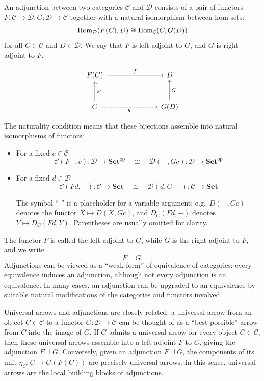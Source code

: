 \begin{definition}
An adjunction between two categories $\mathcal{C}$ and $\mathcal{D}$ consists of a pair of functors
\(
F : \mathcal{C} \to \mathcal{D}, G : \mathcal{D} \to \mathcal{C}
\)
together with a natural isomorphism between hom-sets:
\[
\mathrm{Hom}_{\mathcal{D}}(F(C), D) \cong \mathrm{Hom}_{\mathcal{C}}(C, G(D))
\]
for all $C \in \mathcal{C}$ and $D \in \mathcal{D}$.
We say that $F$ is left adjoint to $G$, and $G$ is right adjoint to $F$.

\[
\begin{tikzcd}[row sep=large, column sep=large]
F(C) \arrow[rr, "f"] & & D \\
C \arrow[u, "F"'] \arrow[rr, dashed, "g"'] & & G(D) \arrow[u, "G"']
\end{tikzcd}
\]


The naturality condition means that these bijections assemble into natural isomorphisms of functors:
\begin{itemize}
  \item For a fixed $c \in \mathcal{C}$
  \[
  \mathcal{C}(F-,c) : \mathcal{D} \to \mathbf{Set}^{\mathrm{op}}
  \quad \cong \quad
  \mathcal{D}(-,Gc) : \mathcal{D} \to \mathbf{Set}^{\mathrm{op}}
  \]
  \item For a fixed $d \in \mathcal{D}$
  \[
  \mathcal{C}(Fd,-) : \mathcal{C} \to \mathbf{Set}
  \quad \cong \quad
  \mathcal{D}(d,G-) : \mathcal{C} \to \mathbf{Set}
\]
\begin{note} The symbol ``-'' is a placeholder for a variable argument: e.g.\ $D(-,Gc)$ denotes the functor $X \mapsto D(X,Gc)$, and $D_C(Fd,-)$ denotes $Y \mapsto D_C(Fd,Y)$. Parentheses are usually omitted for clarity.
\end{note}
\end{itemize}


The functor $F$ is called the left adjoint to $G$, while $G$ is the right adjoint to $F$, and we write
\[
F \dashv G.
\]
Adjunctions can be viewed as a “weak form” of equivalence of categories: every equivalence induces an adjunction, although not every adjunction is an equivalence. In many cases, an adjunction can be upgraded to an equivalence by suitable natural modifications of the categories and functors involved.
\end{definition}

\begin{remark}
Universal arrows and adjunctions are closely related: a universal arrow from an object $C \in \mathcal{C}$ to a functor $G : \mathcal{D} \to \mathcal{C}$ can be thought of as a “best possible” arrow from $C$ into the image of $G$. If $G$ admits a universal arrow for every object $C \in \mathcal{C}$, then these universal arrows assemble into a left adjoint $F$ to $G$, giving the adjunction $F \dashv G$. Conversely, given an adjunction $F \dashv G$, the components of its unit $\eta_C : C \to G(F(C))$ are precisely universal arrows. In this sense, universal arrows are the local building blocks of adjunctions.
\end{remark}

